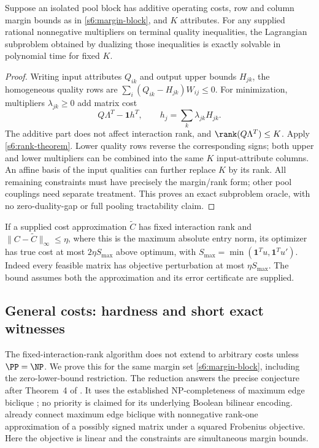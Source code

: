 \begin{corollary}\label{s6:oracle}
Suppose an isolated pool block has additive operating costs, row and
column margin bounds as in \eqref{s6:margin-block}, and $K$ attributes.
For any supplied rational nonnegative multipliers on terminal quality
inequalities, the Lagrangian subproblem obtained by dualizing those
inequalities is exactly solvable in polynomial time for fixed $K$.
\end{corollary}
\begin{proof}
Writing input attributes $Q_{ik}$ and output upper bounds $H_{jk}$,
the homogeneous quality rows are
$\sum_i(Q_{ik}-H_{jk})W_{ij}\le0$.
For minimization, multipliers $\lambda_{jk}\ge0$ add matrix cost
\[
 Q\Lambda^T-\mathbf1 h^T,\qquad h_j=\sum_k\lambda_{jk}H_{jk}.
\]
The additive part does not affect interaction rank, and
$\rank(Q\Lambda^T)\le K$. Apply \cref{s6:rank-theorem}.
Lower quality rows reverse the corresponding signs; both upper and lower
multipliers can be combined into the same $K$ input-attribute columns.
An affine basis of the input qualities can further replace $K$ by its
rank. All remaining constraints must have precisely the margin/rank form;
other pool couplings need separate treatment. This proves an exact
subproblem oracle, with no zero-duality-gap or full pooling tractability
claim.
\end{proof}
If a supplied cost approximation $\widetilde C$ has fixed interaction
rank and $\|C-\widetilde C\|_\infty\le\eta$, where this is the maximum
absolute entry norm, its optimizer has true cost at most
$2\eta S_{\max}$ above optimum, with
$S_{\max}=\min(\mathbf1^Tu,\mathbf1^Tu')$. Indeed every feasible
matrix has objective perturbation at most $\eta S_{\max}$. The bound
assumes both the approximation and its error certificate are supplied.


\subsection{General costs: hardness and short exact witnesses}

The fixed-interaction-rank algorithm does not extend to arbitrary costs
unless $\PP=\NP$. We prove this for the same margin set
\eqref{s6:margin-block}, including the zero-lower-bound restriction.
The reduction answers the precise conjecture after Theorem~4 of
\citet{dey2020-convexifications-of-rank-one-based}. It uses the
established NP-completeness of maximum edge biclique
\cite{app:peeters2003}; no priority is claimed for its underlying
Boolean bilinear encoding. \citet{app:gillis2014} already connect
maximum edge biclique with nonnegative rank-one approximation of a
possibly signed matrix under a squared Frobenius objective. Here the
objective is linear and the constraints are simultaneous margin bounds.


